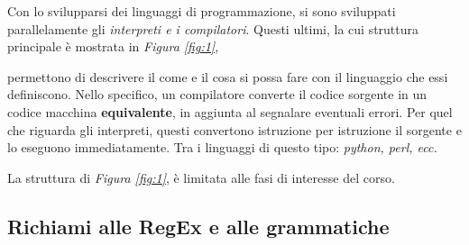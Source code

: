 \documentclass{subfiles}
\begin{document}
Con lo svilupparsi dei linguaggi di programmazione, si sono sviluppati parallelamente gli \emph{interpreti \emph{e i} compilatori}.
Questi ultimi, la cui struttura principale è mostrata in \emph{Figura \ref{fig:1}},

permettono di descrivere il come e il cosa si possa fare con il linguaggio che essi definiscono.
Nello specifico, un compilatore converte il codice sorgente in un codice macchina \textbf{equivalente},
in aggiunta al segnalare eventuali errori.
Per quel che riguarda gli interpreti, questi convertono istruzione per istruzione il sorgente e lo eseguono immediatamente.
Tra i linguaggi di questo tipo: \emph{python, perl, ecc.}

\begin{Remark*}
    La struttura di \emph{Figura \ref{fig:1}}, è limitata alle fasi di interesse del corso.
\end{Remark*}

\subsection{Richiami alle RegEx e alle grammatiche}

\clearpage
\end{document}
